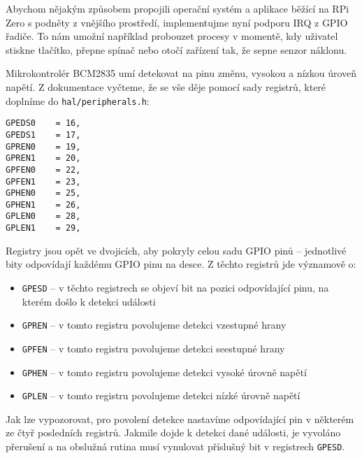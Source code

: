 \documentclass{article}
\begin{document}
Abychom nějakým způsobem propojili operační systém a aplikace běžící na RPi Zero s podněty z vnějšího prostředí, implementujme nyní podporu IRQ z GPIO řadiče. To nám umožní například probouzet procesy v momentě, kdy uživatel stiskne tlačítko, přepne spínač nebo otočí zařízení tak, že sepne senzor náklonu.

Mikrokontrolér BCM2835 umí detekovat na pinu změnu, vysokou a nízkou úroveň napětí. Z dokumentace vyčteme, že se vše děje pomocí sady registrů, které doplníme do \texttt{hal/peripherals.h}:
\begin{lstlisting}
GPEDS0    = 16,
GPEDS1    = 17,
GPREN0    = 19,
GPREN1    = 20,
GPFEN0    = 22,
GPFEN1    = 23,
GPHEN0    = 25,
GPHEN1    = 26,
GPLEN0    = 28,
GPLEN1    = 29,
\end{lstlisting}
Registry jsou opět ve dvojicích, aby pokryly celou sadu GPIO pinů -- jednotlivé bity odpovídají každému GPIO pinu na desce. Z těchto registrů jde významově o:
\begin{itemize}
	\item \texttt{GPESD} -- v těchto registrech se objeví bit na pozici odpovídající pinu, na kterém došlo k detekci události
	\item \texttt{GPREN} -- v tomto registru povolujeme detekci vzestupné hrany
	\item \texttt{GPFEN} -- v tomto registru povolujeme detekci seestupné hrany
	\item \texttt{GPHEN} -- v tomto registru povolujeme detekci vysoké úrovně napětí
	\item \texttt{GPLEN} -- v tomto registru povolujeme detekci nízké úrovně napětí
\end{itemize}

Jak lze vypozorovat, pro povolení detekce nastavíme odpovídající pin v některém ze čtyř posledních registrů. Jakmile dojde k detekci dané události, je vyvoláno přerušení a na obslužná rutina musí vynulovat příslušný bit v registrech \texttt{GPESD}.
\end{document}
